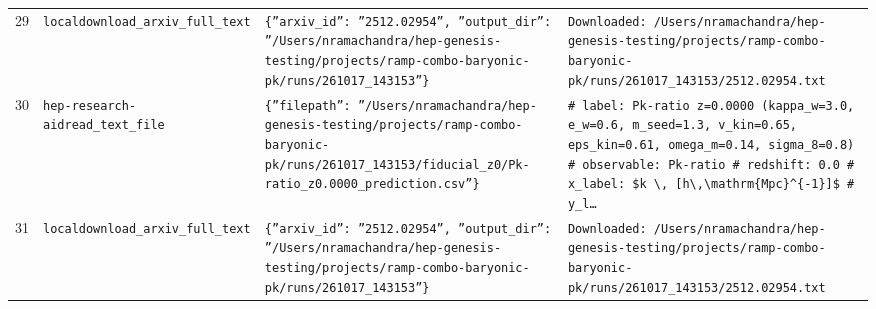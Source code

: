 \documentclass[11pt,a4paper]{article}
\begin{document}
\begin{longtable}{@{}p{}p{}p{}p{}@{}}
29 & \texttt{local}\newline\texttt{download\_\allowbreak{}arxiv\_\allowbreak{}full\_\allowbreak{}text} & \texttt{\{''arxiv\_\allowbreak{}id'':\allowbreak{} ''2512.02954'',\allowbreak{} ''output\_\allowbreak{}dir'':\allowbreak{} ''/\allowbreak{}Users/\allowbreak{}nramachandra/\allowbreak{}hep-genesis-testing/\allowbreak{}projects/\allowbreak{}ramp-combo-baryonic-pk/\allowbreak{}runs/\allowbreak{}261017\_\allowbreak{}143153''\}\allowbreak{}} & \texttt{Downloaded:\allowbreak{} /\allowbreak{}Users/\allowbreak{}nramachandra/\allowbreak{}hep-genesis-testing/\allowbreak{}projects/\allowbreak{}ramp-combo-baryonic-pk/\allowbreak{}runs/\allowbreak{}261017\_\allowbreak{}143153/\allowbreak{}2512.02954.txt} \\
30 & \texttt{hep-research-aid}\newline\texttt{read\_\allowbreak{}text\_\allowbreak{}file} & \texttt{\{''filepath'':\allowbreak{} ''/\allowbreak{}Users/\allowbreak{}nramachandra/\allowbreak{}hep-genesis-testing/\allowbreak{}projects/\allowbreak{}ramp-combo-baryonic-pk/\allowbreak{}runs/\allowbreak{}261017\_\allowbreak{}143153/\allowbreak{}fiducial\_\allowbreak{}z0/\allowbreak{}Pk-ratio\_\allowbreak{}z0.0000\_\allowbreak{}prediction.csv''\}\allowbreak{}} & \texttt{\# label:\allowbreak{} Pk-ratio z=\allowbreak{}0.0000 (kappa\_\allowbreak{}w=\allowbreak{}3.0,\allowbreak{} e\_\allowbreak{}w=\allowbreak{}0.6,\allowbreak{} m\_\allowbreak{}seed=\allowbreak{}1.3,\allowbreak{} v\_\allowbreak{}kin=\allowbreak{}0.65,\allowbreak{} eps\_\allowbreak{}kin=\allowbreak{}0.61,\allowbreak{} omega\_\allowbreak{}m=\allowbreak{}0.14,\allowbreak{} sigma\_\allowbreak{}8=\allowbreak{}0.8)\allowbreak{} \# observable:\allowbreak{} Pk-ratio \# redshift:\allowbreak{} 0.0 \# x\_\allowbreak{}label:\allowbreak{} \$k \textbackslash{}\allowbreak{},\allowbreak{} [h\textbackslash{}\allowbreak{},\allowbreak{}\textbackslash{}\allowbreak{}mathrm\{Mpc\}\allowbreak{}\textasciicircum{}\allowbreak{}\{-1\}\allowbreak{}]\allowbreak{}\$ \# y\_\allowbreak{}l\ldots{}\allowbreak{}} \\
31 & \texttt{local}\newline\texttt{download\_\allowbreak{}arxiv\_\allowbreak{}full\_\allowbreak{}text} & \texttt{\{''arxiv\_\allowbreak{}id'':\allowbreak{} ''2512.02954'',\allowbreak{} ''output\_\allowbreak{}dir'':\allowbreak{} ''/\allowbreak{}Users/\allowbreak{}nramachandra/\allowbreak{}hep-genesis-testing/\allowbreak{}projects/\allowbreak{}ramp-combo-baryonic-pk/\allowbreak{}runs/\allowbreak{}261017\_\allowbreak{}143153''\}\allowbreak{}} & \texttt{Downloaded:\allowbreak{} /\allowbreak{}Users/\allowbreak{}nramachandra/\allowbreak{}hep-genesis-testing/\allowbreak{}projects/\allowbreak{}ramp-combo-baryonic-pk/\allowbreak{}runs/\allowbreak{}261017\_\allowbreak{}143153/\allowbreak{}2512.02954.txt} \\

\end{longtable}
\end{document}
